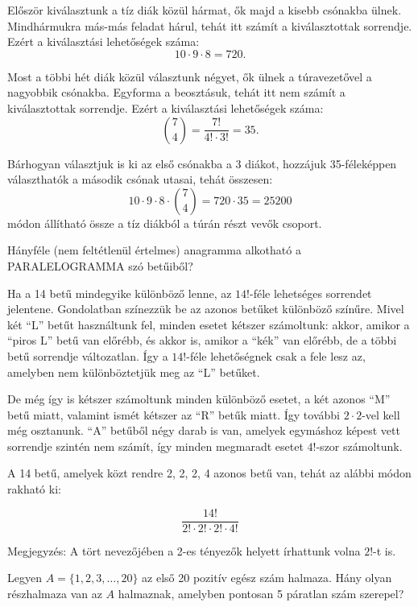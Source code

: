 \begin{solution}
Először kiválasztunk a tíz diák közül hármat, ők majd a kisebb csónakba
ülnek. Mindhármukra más-más feladat hárul, tehát itt számít a kiválasztottak
sorrendje. Ezért a kiválasztási lehetőségek száma: 
\[
10\cdot9\cdot8=720.
\]

Most a többi hét diák közül választunk négyet, ők ülnek a túravezetővel
a nagyobbik csónakba. Egyforma a beosztásuk, tehát itt nem számít
a kiválasztottak sorrendje. Ezért a kiválasztási lehetőségek száma:
\[
\binom{7}{4}=\frac{7!}{4!\cdot3!}=35.
\]

Bárhogyan választjuk is ki az első csónakba a 3 diákot, hozzájuk 35-féleképpen
választhatók a második csónak utasai, tehát összesen: 
\[
10\cdot9\cdot8\cdot\binom{7}{4}=720\cdot35=25200
\]
módon állítható össze a tíz diákból a túrán részt vevők csoport.
\end{solution}
\begin{extraproblem}
Hányféle (nem feltétlenül értelmes) anagramma alkotható a PARALELOGRAMMA
szó betűiből?
\end{extraproblem}

\begin{solution}
Ha a 14 betű mindegyike különböző lenne, az $14!$-féle lehetséges
sorrendet jelentene. Gondolatban színezzük be az azonos betűket különböző
színűre. Mivel két ``L'' betűt használtunk fel, minden esetet kétszer
számoltunk: akkor, amikor a ``piros L'' betű van előrébb, és akkor
is, amikor a ``kék'' van előrébb, de a többi betű sorrendje változatlan.
Így a $14!$-féle lehetőségnek csak a fele lesz az, amelyben nem különböztetjük
meg az ``L'' betűket.

De még így is kétszer számoltunk minden különböző esetet, a két azonos
``M'' betű miatt, valamint ismét kétszer az ``R'' betűk miatt.
Így további $2\cdot2$-vel kell még osztanunk. ``A'' betűből négy
darab is van, amelyek egymáshoz képest vett sorrendje szintén nem
számít, így minden megmaradt esetet $4!$-szor számoltunk.

A 14 betű, amelyek közt rendre 2, 2, 2, 4 azonos betű van, tehát az
alábbi módon rakható ki:

\[
\frac{14!}{2!\cdot2!\cdot2!\cdot4!}
\]

Megjegyzés: A tört nevezőjében a 2-es tényezők helyett írhattunk volna
$2!$-t is.
\end{solution}
\begin{extraproblem}
Legyen $A=\{1,2,3,\dots,20\}$ az első 20 pozitív egész szám halmaza.
Hány olyan részhalmaza van az $A$ halmaznak, amelyben pontosan 5
páratlan szám szerepel? 
\end{extraproblem}


